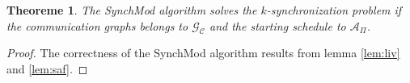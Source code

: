 \documentclass{article}
\newtheorem{theorem}{Theoreme}
\begin{document}
\begin{theorem}
	The SynchMod algorithm solves the $k$-synchronization problem if the communication graphs belongs to $\mathcal{G}_\mathcal{C}$ and the starting schedule to $\mathcal{A}_\Pi$.
\end{theorem}
\begin{proof}
	The correctness of the SynchMod algorithm results from lemma \ref{lem:liv} and \ref{lem:saf}.
\end{proof}
\printbibliography
\end{document}
